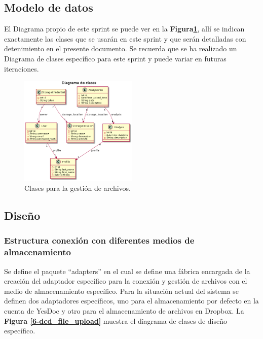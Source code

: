 \documentclass[a4paper,12pt]{article}
\begin{document}
\subsection{Modelo de datos}
El Diagrama propio de este sprint se puede ver en la \textbf{Figura\ref{6-clases_file_upload}}, allí se indican exactamente las clases que se usarán en este sprint y que serán detalladas con detenimiento en el presente documento. Se recuerda que se ha realizado un Diagrama de clases específico para este sprint y puede variar en futuras iteraciones.
    \begin{figure}[h]
        \centering
        \includegraphics[width=0.5\textwidth]{img/dc_file_upload}
        \caption{Clases para la gestión de archivos.}
		\label{6-clases_file_upload}
    \end{figure}


\subsection{Diseño} 

\subsubsection{Estructura conexión con diferentes medios de almacenamiento}
	Se define el paquete ``adapters'' en el cual se define una fábrica encargada de la creación del adaptador específico para la conexión y gestión de archivos con el medio de almacenamiento específico. Para la situación actual del sistema se definen dos adaptadores específicos, uno para el almacenamiento por defecto en la cuenta de YesDoc y otro para el almacenamiento de archivos en Dropbox. La \textbf{Figura \ref{6-dcd_file_upload}} muestra el diagrama de clases de diseño específico.
\end{document}
